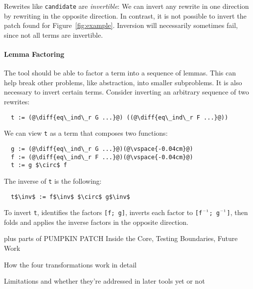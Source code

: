 Rewrites like \lstinline{candidate} are \textit{invertible}:
We can invert any rewrite in one direction by rewriting in the opposite direction.
In contrast, it is not possible to invert the patch \sysname
found for Figure~\ref{fig:example}.
Inversion will necessarily sometimes fail, since not all terms are invertible.

\paragraph{Lemma Factoring} The tool should be able to factor a term into a sequence of lemmas.
This can help break other problems, like abstraction, into smaller subproblems.
It is also necessary to invert certain terms.
Consider inverting an arbitrary sequence of two rewrites:

\begin{lstlisting}
  t := (@\diff{eq\_ind\_r G ...}@) ((@\diff{eq\_ind\_r F ...}@))
\end{lstlisting}
We can view \lstinline{t} as a term that composes two functions:

\begin{lstlisting}
  g := (@\diff{eq\_ind\_r G ...}@)(@\vspace{-0.04cm}@)
  f := (@\diff{eq\_ind\_r F ...}@)(@\vspace{-0.04cm}@)
  t := g $\circ$ f
\end{lstlisting}
The inverse of \lstinline{t} is the following:

\begin{lstlisting}
  t$\inv$ := f$\inv$ $\circ$ g$\inv$
\end{lstlisting}
To invert \lstinline{t}, \sysname identifies the factors \lstinline{[f; g]}, 
inverts each factor to \lstinline{[f}$\inv$\lstinline{; g}$\inv$\lstinline{]}, 
then folds and applies the inverse factors in the opposite direction.

plus parts of PUMPKIN PATCH Inside the Core, Testing Boundaries, Future Work

How the four transformations work in detail

Limitations and whether they're addressed in later tools yet or not
